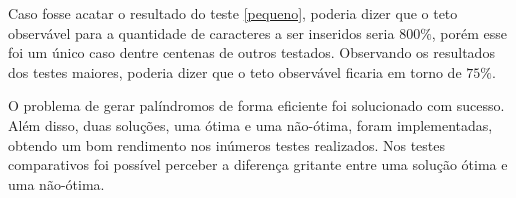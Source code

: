 \documentclass[12pt]{article}
\begin{document}
    Caso fosse acatar o resultado do teste \ref{pequeno}, poderia dizer que o teto observável para a quantidade de caracteres a ser inseridos seria $800\%$, porém esse foi um único caso dentre centenas de outros testados. Observando os resultados dos testes maiores, poderia dizer que o teto observável ficaria em torno de $75\%$.

    O problema de gerar palíndromos de forma eficiente foi solucionado com sucesso. Além disso, duas soluções, uma ótima e uma não-ótima, foram implementadas, obtendo um bom rendimento nos inúmeros testes realizados. Nos testes comparativos foi possível perceber a diferença gritante entre uma solução ótima e uma não-ótima.



\end{document}
